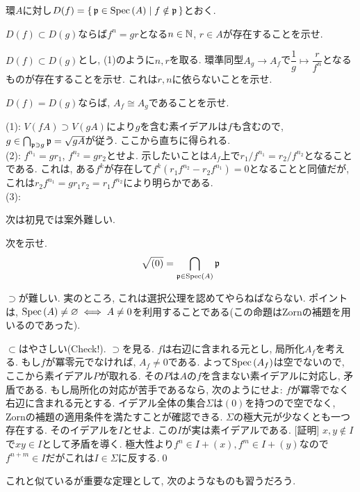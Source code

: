 \begin{egprob}
環$A$に対し$D(f) = \set{\mathfrak{p}\in \mathrm{Spec}\left( A \right) \mid f\notin \mathfrak{p}}$とおく.
\ben
\item $D(f) \subset D(g)$ならば$f^n = gr$となる$n\in \mathbb{N}$, $r\in A$が存在することを示せ.
\item $D(f) \subset D(g)$とし, (1)のように$n,r$を取る. 環準同型$A_{g} \to A_{f}$で$\dfrac{1}{g} \mapsto \dfrac{r}{f^n}$となるものが存在することを示せ.  これは$r,n$に依らないことを示せ.
\item $D(f) = D(g)$ならば, $A_f\cong A_{g}$であることを示せ.
\een
\end{egprob}
\begin{egans}
(1): $V(fA) \supset V(gA)$により$g$を含む素イデアルは$f$も含むので, $g\in \bigcap_{\mathfrak{p}\ni g} \mathfrak{p} = \sqrt{gA}$が従う. ここから直ちに得られる.\\
(2): $f^{n_1} = gr_1$, $f^{n_2} = gr_{2}$とせよ. 示したいことは$A_{f}$上で$r_1/f^{n_1} = r_2/f^{n_2}$となることである. これは, ある$f^k$が存在して$f^k(r_1f^{n_2} - r_2f^{n_1}) = 0$となることと同値だが, これは$r_2f^{n_1} = gr_1r_2 = r_1f^{n_2}$により明らかである. \\
(3):
\end{egans}
次は初見では案外難しい.
\begin{egprob}
次を示せ.
\[\sqrt{(0)} = \bigcap_{\mathfrak{p}\in \mathrm{Spec}\left( A \right)} \mathfrak{p}\]
\end{egprob}
\begin{point}
$\supset$が難しい. 実のところ, これは選択公理を認めてやらねばならない. ポイントは, $\mathrm{Spec}\left( A \right) \neq \varnothing \iff A\neq 0$を利用することである(この命題はZornの補題を用いるのであった).
\end{point}
\begin{egans}
$\subset$はやさしい(Check!). $\supset$を見る. $f$は右辺に含まれる元とし, 局所化$A_{f}$を考える. もし$f$が冪零元でなければ, $A_f\neq 0$である.
よって$\mathrm{Spec}\left( A_f \right)$は空でないので, ここから素イデアル$P$が取れる. その$P$は$A$の$f$を含まない素イデアルに対応し, 矛盾である. もし局所化の対応が苦手であるなら, 次のようにせよ: $f$が冪零でなく右辺に含まれる元とする. イデアル全体の集合$\Sigma$は$(0)$を持つので空でなく, Zornの補題の適用条件を満たすことが確認できる. $\Sigma$の極大元が少なくとも一つ存在する. そのイデアルを$I$とせよ. この$I$が実は素イデアルである. [証明] $x,y\notin I$で$xy\in I$として矛盾を導く. 極大性より$f^n\in I+(x), f^m\in I+(y)$なので$f^{n+m}\in I$だがこれは$I\in \Sigma$に反する.\qed
\end{egans}
これと似ているが重要な定理として, 次のようなものも習うだろう.

